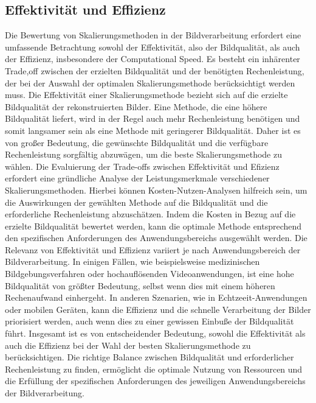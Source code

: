     \subsection{Effektivität und Effizienz}

        Die Bewertung von Skalierungsmethoden in der Bildverarbeitung erfordert eine umfassende Betrachtung sowohl der Effektivität, also der Bildqualität, als auch der Effizienz, insbesondere der Computational Speed. 
        Es besteht ein inhärenter Trade,off zwischen der erzielten Bildqualität und der benötigten Rechenleistung, der bei der Auswahl der optimalen Skalierungsmethode berücksichtigt werden muss.
        Die Effektivität einer Skalierungsmethode bezieht sich auf die erzielte Bildqualität der rekonstruierten Bilder. 
        Eine Methode, die eine höhere Bildqualität liefert, wird in der Regel auch mehr Rechenleistung benötigen und somit langsamer sein als eine Methode mit geringerer Bildqualität. 
        Daher ist es von großer Bedeutung, die gewünschte Bildqualität und die verfügbare Rechenleistung sorgfältig abzuwägen, um die beste Skalierungsmethode zu wählen.
        Die Evaluierung der Trade-offs zwischen Effektivität und Efizienz erfordert eine gründliche Analyse der Leistungsmerkmale verschiedener Skalierungsmethoden. 
        Hierbei können Kosten-Nutzen-Analysen hilfreich sein, um die Auswirkungen der gewählten Methode auf die Bildqualität und die erforderliche Rechenleistung abzuschätzen. 
        Indem die Kosten in Bezug auf die erzielte Bildqualität bewertet werden, kann die optimale Methode entsprechend den spezifischen Anforderungen des Anwendungsbereichs ausgewählt werden.
        Die Relevanz von Effektivität und Effizienz variiert je nach Anwendungsbereich der Bildverarbeitung. 
        In einigen Fällen, wie beispielsweise medizinischen Bildgebungsverfahren oder hochauflösenden Videoanwendungen, ist eine hohe Bildqualität von größter Bedeutung, selbst wenn dies mit einem höheren Rechenaufwand einhergeht. 
        In anderen Szenarien, wie in Echtzeeit-Anwendungen oder mobilen Geräten, kann die Effizienz und die schnelle Verarbeitung der Bilder priorisiert werden, auch wenn dies zu einer gewissen Einbuße der Bildqualität führt.
        Insgesamt ist es von entscheidender Bedeutung, sowohl die Effektivität als auch die Effizienz bei der Wahl der besten Skalierungsmethode zu berücksichtigen. 
        Die richtige Balance zwischen Bildqualität und erforderlicher Rechenleistung zu finden, ermöglicht die optimale Nutzung von Ressourcen und die Erfüllung der spezifischen Anforderungen des jeweiligen Anwendungsbereichs der Bildverarbeitung.

